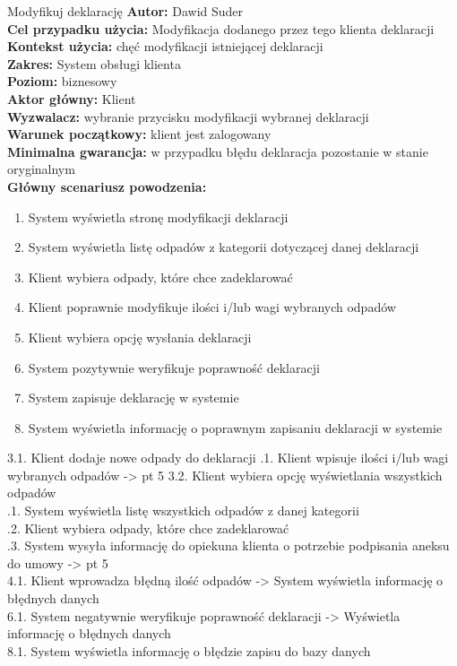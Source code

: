 \begin{usecase}{Modyfikuj deklarację}
	\textbf{Autor:} Dawid Suder \\
	\textbf{Cel przypadku użycia:} Modyfikacja dodanego przez tego klienta deklaracji \\
	\textbf{Kontekst użycia:} chęć modyfikacji istniejącej deklaracji\\
	\textbf{Zakres:} System obsługi klienta \\
	\textbf{Poziom:} biznesowy \\
	\textbf{Aktor główny:} Klient\\
	\textbf{Wyzwalacz:} wybranie przycisku modyfikacji wybranej deklaracji \\
	\textbf{Warunek początkowy:} klient jest zalogowany\\
	\textbf{Minimalna gwarancja:} w przypadku błędu deklaracja pozostanie w stanie oryginalnym \\
	\textbf{Główny scenariusz powodzenia:} \\
		\begin{enumerate}
			\item System wyświetla stronę modyfikacji deklaracji
			\item System wyświetla listę odpadów z kategorii dotyczącej danej deklaracji
			\item Klient wybiera odpady, które chce zadeklarować
			\item Klient poprawnie modyfikuje ilości i/lub wagi wybranych odpadów
			\item Klient wybiera opcję wysłania deklaracji
			\item System pozytywnie weryfikuje poprawność deklaracji
			\item System zapisuje deklarację w systemie
			\item System wyświetla informację o poprawnym zapisaniu deklaracji w systemie
		\end{enumerate}
			3.1. Klient dodaje nowe odpady do deklaracji
				.1. Klient wpisuje ilości i/lub wagi wybranych odpadów -> pt 5
			3.2. Klient wybiera opcję wyświetlania wszystkich odpadów \\
				.1. System wyświetla listę wszystkich odpadów z danej kategorii \\
				.2. Klient wybiera odpady, które chce zadeklarować \\
				.3. System wysyła informację do opiekuna klienta o potrzebie podpisania aneksu do umowy -> pt 5 \\
			4.1. Klient wprowadza błędną ilość odpadów -> System wyświetla informację o błędnych danych \\
			6.1. System negatywnie weryfikuje poprawność deklaracji -> Wyświetla informację o błędnych danych \\
			8.1. System wyświetla informację o błędzie zapisu do bazy danych \\
\end{usecase}

